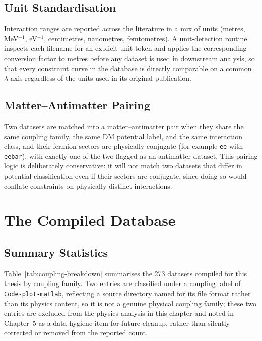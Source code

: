 \documentclass[main]{subfiles}
\begin{document}
\subsection{Unit Standardisation}

Interaction ranges are reported across the literature in a mix of units
(metres, MeV$^{-1}$, eV$^{-1}$, centimetres, nanometres, femtometres). A
unit-detection routine inspects each filename for an explicit unit token
and applies the corresponding conversion factor to metres before any
dataset is used in downstream analysis, so that every constraint curve in
the database is directly comparable on a common $\lambda$ axis regardless
of the units used in its original publication.

\subsection{Matter--Antimatter Pairing}

Two datasets are matched into a matter--antimatter pair when they share the
same coupling family, the same DM potential label, and the same interaction
class, and their fermion sectors are physically conjugate (for example
\texttt{ee} with \texttt{eebar}), with exactly one of the two flagged as an
antimatter dataset. This pairing logic is deliberately conservative: it
will not match two datasets that differ in potential classification even
if their sectors are conjugate, since doing so would conflate constraints
on physically distinct interactions.

\section{The Compiled Database}
\label{sec:database}

\subsection{Summary Statistics}

Table~\ref{tab:coupling-breakdown} summarises the 273 datasets compiled for
this thesis by coupling family. Two entries are classified under a coupling
label of \texttt{Code-plot-matlab}, reflecting a source directory named for
its file format rather than its physics content, so it is not a genuine
physical coupling family; these two entries are excluded from the physics
analysis in this chapter and noted in Chapter~5 as a data-hygiene item for
future cleanup, rather than silently corrected or removed from the
reported count.
\end{document}
